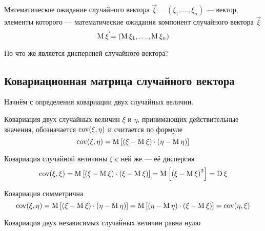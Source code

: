 \begin{definition}
  Математическое ожидание случайного вектора
  $\vec{\xi} = \left( \xi_1, \dots, \xi_n \right)$ --- вектор,
  элементы которого --- математические ожидания компонент
  случайного вектора $\vec{\xi}$
  $$\operatorname{M}_{} \vec{\xi} = \left( \operatorname{M}_{} \xi_1, \dots, \operatorname{M}_{} \xi_n \right)$$
\end{definition}

Но что же является дисперсией случайного вектора?

\subsection{Ковариационная матрица случайного вектора}

Начнём с определения ковариации двух случайных величин.

\begin{definition}[Ковариация]
  Ковариация двух случайных величин $\xi$ и $\eta$, принимающих действительные
  значения, обозначается $\operatorname{cov}\!\left( \xi, \eta \right)$ и считается по формуле
  $$\operatorname{cov}\!\left( \xi, \eta \right)
      = \operatorname{M}_{} \left[ \left( \xi - \operatorname{M}_{} \xi \right)
      \cdot \left( \eta - \operatorname{M}_{} \eta \right) \right]$$
\end{definition}

\begin{remark}
  Ковариация случайной величины $\xi$ с ней же --- её дисперсия
  $$\operatorname{cov}\!\left( \xi, \xi \right)
      = \operatorname{M}_{} \left[ \left( \xi - \operatorname{M}_{} \xi \right)
      \cdot \left( \xi - \operatorname{M}_{} \xi \right) \right]
      = \operatorname{M}_{} \left[ \left( \xi - \operatorname{M}_{} \xi \right)^2 \right]
      = \operatorname{D}_{} \xi$$
\end{remark}

\begin{remark}
  Ковариация симметрична
  $$\operatorname{cov}\!\left( \xi, \eta \right)
      = \operatorname{M}_{} \left[ \left( \xi - \operatorname{M}_{} \xi \right)
      \cdot \left( \eta - \operatorname{M}_{} \eta \right) \right]
      = \operatorname{M}_{} \left[ \left( \eta - \operatorname{M}_{} \eta \right)
      \cdot \left( \xi - \operatorname{M}_{} \xi \right) \right]
      = \operatorname{cov}\!\left( \eta, \xi \right)$$
\end{remark}

\begin{remark}\label{rem:covIndepentent}
  Ковариация двух независимых случайных величин равна нулю
  \cite[с.~244]{Feller1}
\end{remark}

